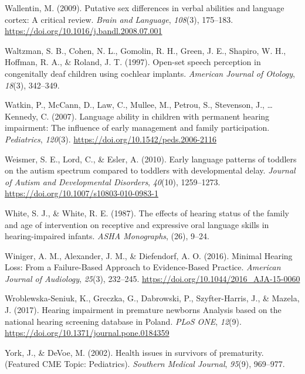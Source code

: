 \documentclass[english,man]{apa6}
\begin{document}
\leavevmode\hypertarget{ref-wallentin2009}{}%
Wallentin, M. (2009). Putative sex differences in verbal abilities and language cortex: A critical review. \emph{Brain and Language}, \emph{108}(3), 175--183. \url{https://doi.org/10.1016/j.bandl.2008.07.001}

\leavevmode\hypertarget{ref-waltzman1997}{}%
Waltzman, S. B., Cohen, N. L., Gomolin, R. H., Green, J. E., Shapiro, W. H., Hoffman, R. A., \& Roland, J. T. (1997). Open-set speech perception in congenitally deaf children using cochlear implants. \emph{American Journal of Otology}, \emph{18}(3), 342--349.

\leavevmode\hypertarget{ref-watkin2007}{}%
Watkin, P., McCann, D., Law, C., Mullee, M., Petrou, S., Stevenson, J., \ldots{} Kennedy, C. (2007). Language ability in children with permanent hearing impairment: The influence of early management and family participation. \emph{Pediatrics}, \emph{120}(3). \url{https://doi.org/10.1542/peds.2006-2116}

\leavevmode\hypertarget{ref-weismer2010}{}%
Weismer, S. E., Lord, C., \& Esler, A. (2010). Early language patterns of toddlers on the autism spectrum compared to toddlers with developmental delay. \emph{Journal of Autism and Developmental Disorders}, \emph{40}(10), 1259--1273. \url{https://doi.org/10.1007/s10803-010-0983-1}

\leavevmode\hypertarget{ref-white1987}{}%
White, S. J., \& White, R. E. (1987). The effects of hearing status of the family and age of intervention on receptive and expressive oral language skills in hearing-impaired infants. \emph{ASHA Monographs}, (26), 9--24.

\leavevmode\hypertarget{ref-winiger2016}{}%
Winiger, A. M., Alexander, J. M., \& Diefendorf, A. O. (2016). Minimal Hearing Loss: From a Failure-Based Approach to Evidence-Based Practice. \emph{American Journal of Audiology}, \emph{25}(3), 232--245. \url{https://doi.org/10.1044/2016_AJA-15-0060}

\leavevmode\hypertarget{ref-wroblewska-seniuk2017}{}%
Wroblewska-Seniuk, K., Greczka, G., Dabrowski, P., Szyfter-Harris, J., \& Mazela, J. (2017). Hearing impairment in premature newborns Analysis based on the national hearing screening database in Poland. \emph{PLoS ONE}, \emph{12}(9). \url{https://doi.org/10.1371/journal.pone.0184359}

\leavevmode\hypertarget{ref-york2002}{}%
York, J., \& DeVoe, M. (2002). Health issues in survivors of prematurity. (Featured CME Topic: Pediatrics). \emph{Southern Medical Journal}, \emph{95}(9), 969--977.
\end{document}
